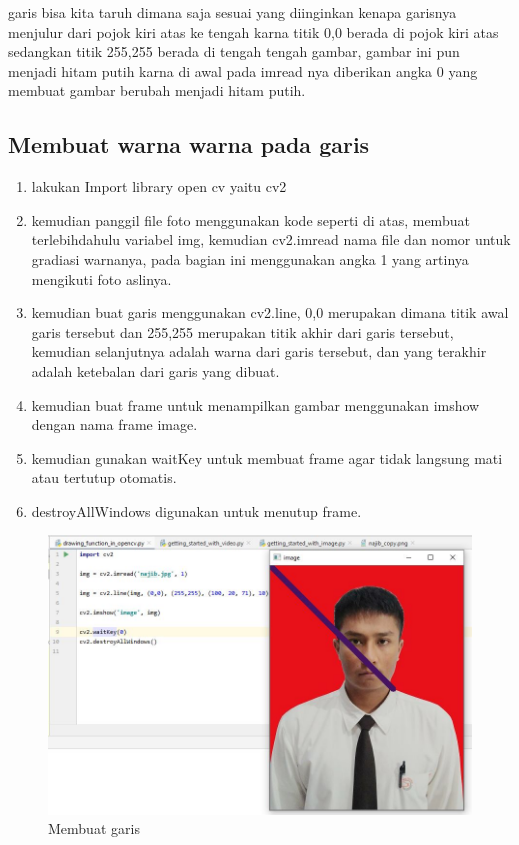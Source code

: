 garis bisa kita taruh dimana saja sesuai yang diinginkan kenapa garisnya menjulur dari pojok kiri atas ke tengah karna titik 0,0 berada di pojok kiri atas sedangkan titik 255,255 berada di tengah tengah gambar, gambar ini pun menjadi hitam putih karna di awal pada imread nya diberikan angka 0 yang membuat gambar berubah menjadi hitam putih.

\newpage
\subsection{Membuat warna warna pada garis}

\begin{enumerate}
	\item lakukan Import library open cv yaitu cv2
	\item kemudian panggil file foto menggunakan kode seperti di atas, membuat terlebihdahulu variabel img, kemudian cv2.imread nama file dan nomor untuk gradiasi warnanya, pada bagian ini menggunakan angka 1 yang artinya mengikuti foto aslinya.
	\item kemudian buat garis menggunakan cv2.line, 0,0 merupakan dimana titik awal garis tersebut dan 255,255 merupakan titik akhir dari garis tersebut, kemudian selanjutnya adalah warna dari garis tersebut, dan yang terakhir adalah ketebalan dari garis yang dibuat.
	\item kemudian buat frame untuk menampilkan gambar menggunakan imshow dengan nama frame image.
	\item kemudian gunakan waitKey untuk membuat frame agar tidak langsung mati atau tertutup otomatis.
	\item destroyAllWindows digunakan untuk menutup frame.
\end{enumerate}

\newpage
\begin{figure}[ht]
\centering
\includegraphics[scale=0.5]{figures/2,9.jpg}
\caption{Membuat garis}
\label{contoh}
\end{figure}

